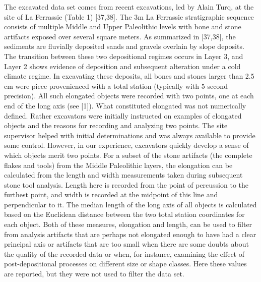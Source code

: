 \documentclass[]{article}
\begin{document}
The excavated data set comes from recent excavations, led by Alain Turq,
at the site of La Ferrassie (Table 1) {[}37,38{]}. The 3m La Ferrassie
stratigraphic sequence consists of multiple Middle and Upper Paleolithic
levels with bone and stone artifacts exposed over several square meters.
As summarized in {[}37,38{]}, the sediments are fluvially deposited
sands and gravels overlain by slope deposits. The transition between
these two depositional regimes occurs in Layer 3, and Layer 2 shows
evidence of deposition and subsequent alteration under a cold climate
regime. In excavating these deposits, all bones and stones larger than
2.5 cm were piece provenienced with a total station (typically with 5
second precision). All such elongated objects were recorded with two
points, one at each end of the long axis (see {[}1{]}). What constituted
elongated was not numerically defined. Rather excavators were initially
instructed on examples of elongated objects and the reasons for
recording and analyzing two points. The site supervisor helped with
initial determinations and was always available to provide some control.
However, in our experience, excavators quickly develop a sense of which
objects merit two points. For a subset of the stone artifacts (the
complete flakes and tools) from the Middle Paleolithic layers, the
elongation can be calculated from the length and width measurements
taken during subsequent stone tool analysis. Length here is recorded
from the point of percussion to the furthest point, and width is
recorded at the midpoint of this line and perpendicular to it. The
median length of the long axis of all objects is calculated based on the
Euclidean distance between the two total station coordinates for each
object. Both of these measures, elongation and length, can be used to
filter from analysis artifacts that are perhaps not elongated enough to
have had a clear principal axis or artifacts that are too small when
there are some doubts about the quality of the recorded data or when,
for instance, examining the effect of post-depositional processes on
different size or shape classes. Here these values are reported, but
they were not used to filter the data set.
\end{document}

